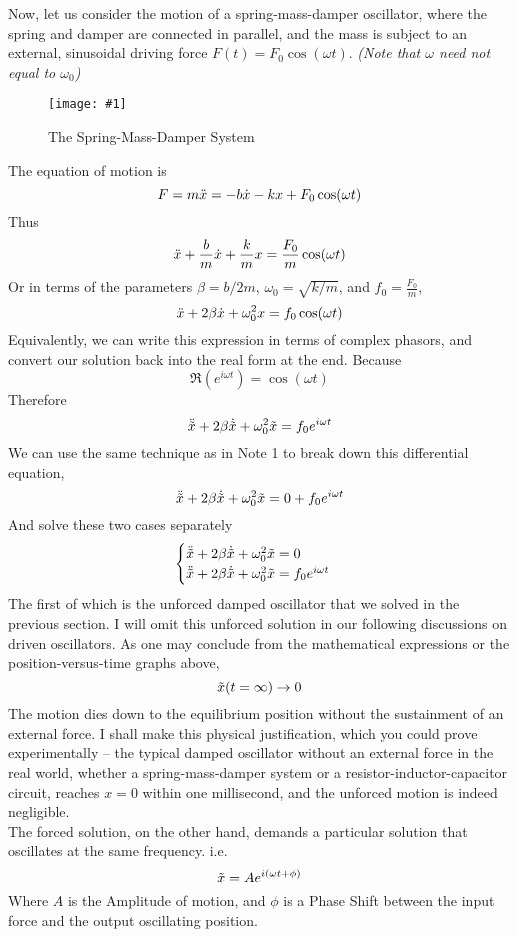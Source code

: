 \documentclass[11pt]{article}
\newcommand{\fig}[4]{
    \begin{figure}[H]
        \centering
        \texttt{[image: \#1]}
        \caption{#2}
        \label{exp4fit}
    \end{figure}
}
\theoremstyle{gangnamstyle}{\newtheorem{definition}{Definition}[]}
\theoremstyle{gangnamstyle}{\newtheorem{example}{Example}[]}
\theoremstyle{gangnamstyle}{\newtheorem{problem}{Problem}[]}
\theoremstyle{gangnamstyle}{\newtheorem{warning}{Warning}[]}
\begin{document}
Now, let us consider the motion of a spring-mass-damper oscillator, where the spring and damper are connected in parallel, and the mass is subject to an external, sinusoidal driving force $F(t) = F_0\cos(\omega t)$. \textit{(Note that $\omega$ need not equal to $\omega_0$)} 
\fig{figs/n2/damper.png}{The Spring-Mass-Damper System}{1.25}{0}
The equation of motion is
\[ F = m\Ddot{x} = -b\Dot{x} - kx + F_0\cos(\omega t) \]
Thus
\[ \Ddot{x} + \frac{b}{m}\Dot{x} + \frac{k}{m}x = \frac{F_0}{m}\cos(\omega t) \]
Or in terms of the parameters $\beta = b/2m$, $\omega_0 = \sqrt{k / m}$, and $f_0 = \frac{F_0}{m}$, 
\[ \Ddot{x} + 2\beta\Dot{x} + \omega_0^2x = f_0\cos(\omega t) \]
Equivalently, we can write this expression in terms of complex phasors, and convert our solution back into the real form at the end. Because
\[ \Re(e^{i\omega t}) = \cos(\omega t) \]
Therefore
\[ \Ddot{\Tilde{x}} + 2\beta\Dot{\Tilde{x}} + \omega_0^2\Tilde{x} = f_0e^{i\omega t} \]
We can use the same technique as in Note 1 to break down this differential equation, 
\[ \Ddot{\Tilde{x}} + 2\beta\Dot{\Tilde{x}} + \omega_0^2\Tilde{x} = 0 + f_0e^{i\omega t} \]
And solve these two cases separately
\[ \begin{cases}
\Ddot{\Tilde{x}} + 2\beta\Dot{\Tilde{x}} + \omega_0^2\Tilde{x} = 0 \\
\Ddot{\Tilde{x}} + 2\beta\Dot{\Tilde{x}} + \omega_0^2\Tilde{x} = f_0e^{i\omega t}
\end{cases} \]
The first of which is the unforced damped oscillator that we solved in the previous section. I will omit this unforced solution in our following discussions on driven oscillators. As one may conclude from the mathematical expressions or the position-versus-time graphs above, 
\[ \Tilde{x}(t = \infty) \rightarrow 0 \]
The motion dies down to the equilibrium position without the sustainment of an external force. I shall make this physical justification, which you could prove experimentally -- the typical damped oscillator without an external force in the real world, whether a spring-mass-damper system or a resistor-inductor-capacitor circuit, reaches $x = 0$ within one millisecond, and the unforced motion is indeed negligible. \\

The forced solution, on the other hand, demands a particular solution that oscillates at the same frequency. i.e.
\[ \Tilde{x} = Ae^{i(\omega t + \phi)} \]
Where $A$ is the Amplitude of motion, and $\phi$ is a Phase Shift between the input force and the output oscillating position. 
\end{document}
